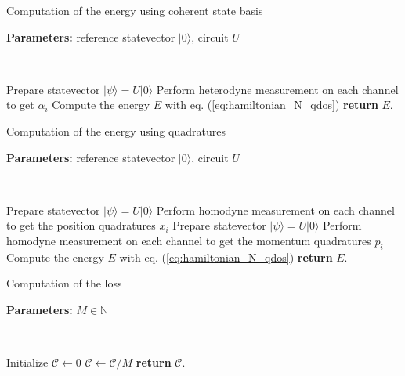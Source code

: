 \documentclass[reprint, amsmath, amssymb, aps]{revtex4-2}
\begin{document}
    \begin{algorithm}
        \caption{Computation of the energy using coherent state basis}\label{alg:energy_computation_coherent_basis}
            \textbf{Parameters:} reference statevector $|0\rangle$, circuit $U$

            \

            Prepare statevector $|\psi\rangle = U|0\rangle$\;
            Perform heterodyne measurement on each channel to get $\alpha_i$\;
            Compute the energy $E$ with eq. (\ref{eq:hamiltonian_N_qdos})\;
            \textbf{return} $E$.
    \end{algorithm}

    \begin{algorithm}
        \caption{Computation of the energy using quadratures}
        \label{alg:energy_computation_quadratures}
            \textbf{Parameters:} reference statevector $|0\rangle$, circuit $U$

            \

            Prepare statevector $|\psi\rangle = U|0\rangle$\;
            Perform homodyne measurement on each channel to get the position quadratures $x_i$\;
            Prepare statevector $|\psi\rangle = U|0\rangle$\;
            Perform homodyne measurement on each channel to get the momentum quadratures $p_i$\;
            Compute the energy $E$ with eq. (\ref{eq:hamiltonian_N_qdos})\;
            \textbf{return} $E$.
    \end{algorithm}

    \begin{algorithm}
        \caption{Computation of the loss}\label{alg:loss_computation}
            \textbf{Parameters:} $M\in\mathbb N$

            \

            Initialize $\mathcal C \gets 0$\;
                $\mathcal C \gets \mathcal C / M$\;
            \textbf{return} $\mathcal C$.
    \end{algorithm}
\end{document}
